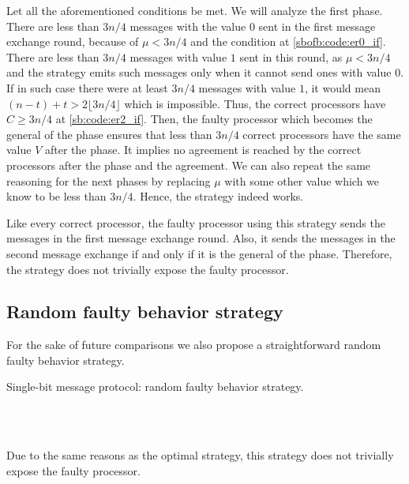 Let all the aforementioned conditions be met. We will analyze the first phase. There are less than $3n/4$ messages with the value $0$ sent in the first message exchange round, because of $\mu<3n/4$ and the condition at \cref{sbofb:code:er0_if}. There are less than $3n/4$ messages with value $1$ sent in this round, as $\mu<3n/4$ and the strategy emits such messages only when it cannot send ones with value $0$. If in such case there were at least $3n/4$ messages with value $1$, it would mean $(n-t) + t > 2\lfloor3n/4\rfloor$ which is impossible. Thus, the correct processors have $C\geq 3n/4$ at \cref{sb:code:er2_if}. Then, the faulty processor which becomes the general of the phase ensures that less than $3n/4$ correct processors have the same value $V$ after the phase. It implies no agreement is reached by the correct processors after the phase and the agreement. We can also repeat the same reasoning for the next phases by replacing $\mu$ with some other value which we know to be less than $3n/4$. Hence, the strategy indeed works.

Like every correct processor, the faulty processor using this strategy sends the messages in the first message exchange round. Also, it sends the messages in the second message exchange if and only if it is the general of the phase. Therefore, the strategy does not trivially expose the faulty processor.

\subsection{Random faulty behavior strategy}
For the sake of future comparisons we also propose a straightforward random faulty behavior strategy.
\begin{algorithm}[H]
  \caption{Single-bit message protocol: random faulty behavior strategy.}
  \begin{algorithmic}[1]
            \State {}
        \EndFor
        \\
        \State {}
                \State {}
            \EndFor
        \EndIf
        \\
        \State {}
    \EndFor
  \end{algorithmic}
\end{algorithm}
Due to the same reasons as the optimal strategy, this strategy does not trivially expose the faulty processor.

